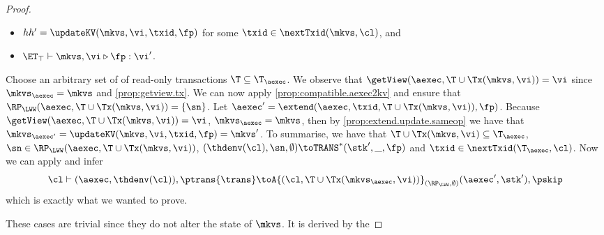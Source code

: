 \begin{proof}
\begin{itemize}
\item $hh' = \updateKV(\mkvs, \vi, \txid, \fp)$ for some $\txid \in \nextTxid(\mkvs, \cl)$, and
\item $\ET_{\top} \vdash \mkvs, \vi \triangleright \fp: \vi'$.
\end{itemize}
Choose an arbitrary set of of read-only transactions $\T \subseteq \T_{\aexec}$.
We observe that $\getView(\aexec, \T \cup \Tx(\mkvs, \vi)) = \vi$ since $\mkvs_{\aexec} = \mkvs$ and \cref{prop:getview.tx}.
We can now apply \cref{prop:compatible.aexec2kv} and ensure that $\RP_{\LWW}(\aexec, \T \cup \Tx(\mkvs, \vi)) = \{\sn\}$.
Let $\aexec' = \extend(\aexec, \txid, \T \cup \Tx(\mkvs, \vi)), \fp)$. 
Because $\getView(\aexec, \T \cup \Tx(\mkvs, \vi)) = \vi$, $\mkvs_{\aexec} = \mkvs$,
then by \cref{prop:extend.update.sameop} we have that $\mkvs_{\aexec'} = \updateKV(\mkvs, \vi, \txid, \fp) = \mkvs'$. 
To summarise, we have that $\T \cup \Tx(\mkvs, \vi) \subseteq \T_{\aexec}$, $\sn \in \RP_{\LWW}(\aexec, \T \cup \Tx(\mkvs, \vi))$,
$(\thdenv(\cl), \sn, \emptyset) \toTRANS^{\ast} (\stk', \_, \fp)$ and $\txid \in \nextTxid(\T_{\aexec}, \cl)$. 
Now we can apply  and infer
\[
\cl \vdash (\aexec, \thdenv(\cl)), \ptrans{\trans} \toA{(\cl, \T \cup \Tx(\mkvs_{\aexec}, \vi))}_{(\RP_{\LWW}, \emptyset)} 
(\aexec', \stk'), \pskip
\]
which is exactly what we wanted to prove. 

These cases are trivial since they do not alter the state of \( \mkvs \).
It is derived by the \ih
\end{proof}

